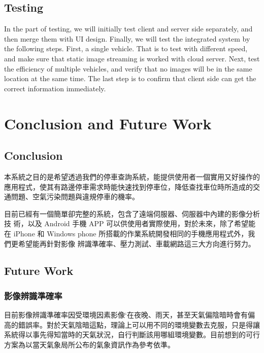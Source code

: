 \documentclass[runningheads,a4paper]{llncs}
\begin{document}
\begin{CJK}{UTF8}{bsmi}
\subsection{Testing}

In the part of testing, we will initially test client and server side
separately, and then merge them with UI design. Finally, we will test
the integrated system by the following steps. First, a single vehicle.
That is to test with different speed, and make sure that static image
streaming is worked with cloud server. Next, test the efficiency of
multiple vehicles, and verify that no images will be in the same
location at the same time. The last step is to confirm that client side
can get the correct information immediately.

\section{Conclusion and Future Work}\label{sec:conclusion}

\subsection{Conclusion}

本系統之目的是希望透過我們的停車查詢系統，能提供使用者一個實用又好操作的應用程式，使其有路邊停車需求時能快速找到停車位，降低查找車位時所造成的交通問題、空氣污染問題與違規停車的機率。

目前已經有一個簡單卻完整的系統，包含了遠端伺服器、伺服器中內建的影像分析技
術，以及 Android 手機 APP 可以供使用者實際使用，對於未來，除了希望能在
iPhone 和 Windows phone
所搭載的作業系統開發相同的手機應用程式外，我們更希望能再針對影像
辨識準確率、壓力測試、車載網路這三大方向進行努力。 

\subsection{Future Work}

\subsubsection{影像辨識準確率}

目前影像辨識準確率因受環境因素影像`在夜晚、雨天，甚至天氣偏陰暗時會有偏高的錯誤率。對於天氣陰暗這點，理論上可以用不同的環境變數去克服，只是得讓系統得以事先得知當時的天氣狀況，自行判斷該用哪組環境變數。目前想到的可行方案為以當天氣象局所公布的氣象資訊作為參考依準。


\end{CJK}
\end{document}
